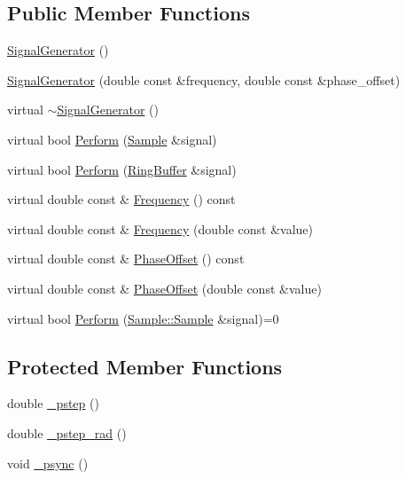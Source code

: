 \subsection*{Public Member Functions}
\begin{DoxyCompactItemize}
\item 
\hyperlink{classDSG_1_1SignalGenerator_a13ebda67fcdc880ef41aff501cc23fc3}{Signal\+Generator} ()
\item 
\hyperlink{classDSG_1_1SignalGenerator_a22c9bd8f74d6fabdf1104e5b9afbe08a}{Signal\+Generator} (double const \&frequency, double const \&phase\+\_\+offset)
\item 
virtual \hyperlink{classDSG_1_1SignalGenerator_a7b52d391974bc36a19fdcf617ad976cb}{$\sim$\+Signal\+Generator} ()
\item 
virtual bool \hyperlink{classDSG_1_1SignalGenerator_a95d485b68d874938ac93644b121607b9}{Perform} (\hyperlink{classDSG_1_1Sample}{Sample} \&signal)
\item 
virtual bool \hyperlink{classDSG_1_1SignalGenerator_abaa9aecd00b792d46166b91524b42db6}{Perform} (\hyperlink{classDSG_1_1RingBuffer}{Ring\+Buffer} \&signal)
\item 
virtual double const \& \hyperlink{classDSG_1_1SignalGenerator_aedac746c5a70818d120858542ecb7c45}{Frequency} () const 
\item 
virtual double const \& \hyperlink{classDSG_1_1SignalGenerator_ae3ce8d45bafabbd86a0f535b15c3cd46}{Frequency} (double const \&value)
\item 
virtual double const \& \hyperlink{classDSG_1_1SignalGenerator_a1ce521847edd0b837fd840998f906b4b}{Phase\+Offset} () const 
\item 
virtual double const \& \hyperlink{classDSG_1_1SignalGenerator_a08b71b1f30ba65e629642c570291dc0e}{Phase\+Offset} (double const \&value)
\item 
virtual bool \hyperlink{classDSG_1_1SignalProcess_afdb8220100418893950c1161dd24db67}{Perform} (\hyperlink{classDSG_1_1Sample_aaf2e30d73911eccea99b53eeee15b612}{Sample\+::\+Sample} \&signal)=0
\end{DoxyCompactItemize}
\subsection*{Protected Member Functions}
\begin{DoxyCompactItemize}
\item 
double \hyperlink{classDSG_1_1SignalGenerator_ac0d781b8673b3a283bf7c133290ede50}{\+\_\+pstep} ()
\item 
double \hyperlink{classDSG_1_1SignalGenerator_ae660eb4caa88b8d278f8d24d0908a487}{\+\_\+pstep\+\_\+rad} ()
\item 
void \hyperlink{classDSG_1_1SignalGenerator_a05baccb38d1e52860d4fcf7cb8430efc}{\+\_\+psync} ()
\end{DoxyCompactItemize}

